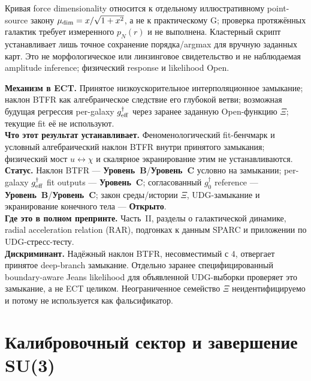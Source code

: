 \documentclass[11pt,a4paper]{article}
\newcommand{\statB}{\textbf{Уровень~B}}
\newcommand{\statC}{\textbf{Уровень~C}}
\newcommand{\statO}{\textbf{Открыто}}
\begin{document}
Кривая force dimensionality относится к отдельному иллюстративному
point-source закону $\mu_{\rm dim}=x/\sqrt{1+x^2}$, а не к практическому G;
проверка протяжённых галактик требует измеренного $p_N(r)$ и не выполнена.
Кластерный скрипт устанавливает лишь точное сохранение порядка/argmax для
вручную заданных карт. Это не морфологическое или линзинговое свидетельство
и не наблюдаемая amplitude inference; физический response и likelihood Open.

\begin{mechbox}
\textbf{Механизм в ECT.}
Принятое низкоускорительное интерполяционное замыкание;
наклон BTFR как алгебраическое следствие его глубокой ветви;
возможная будущая регрессия per-galaxy $g^\dagger_{\rm eff}$ через заранее заданную Open-функцию $\Xi$; текущие fit её не используют.\\
\textbf{Что этот результат устанавливает.} Феноменологический
fit-бенчмарк и условный алгебраический наклон BTFR внутри принятого
замыкания; физический мост $u\leftrightarrow\chi$ и скалярное
экранирование этим не устанавливаются.\\
\textbf{Статус.} Наклон BTFR — \statB{}/\statC{} условно на замыкании; per-galaxy $g^\dagger_{\rm eff}$ fit outputs — \statC{}; согласованный $g^\dagger_0$ reference — \statB{}/\statC{}; закон среды/истории $\Xi$, UDG-замыкание и экранирование конечного тела — \statO.\\
\textbf{Где это в полном препринте.} Часть~II, разделы о
галактической динамике, radial acceleration relation (RAR),
подгонках к данным SPARC и приложении по UDG-стресс-тесту.\\
\textbf{Дискриминант.} Надёжный наклон BTFR, несовместимый с $4$, отвергает принятое deep-branch замыкание.  Отдельно заранее специфицированный boundary-aware Jeans likelihood для объявленной UDG-выборки проверяет это замыкание, а не ECT целиком.  Неограниченное семейство $\Xi$ неидентифицируемо и потому не используется как фальсификатор.
\end{mechbox}

\section{Калибровочный сектор и завершение SU(3)}
\label{sec:gauge}
\end{document}
